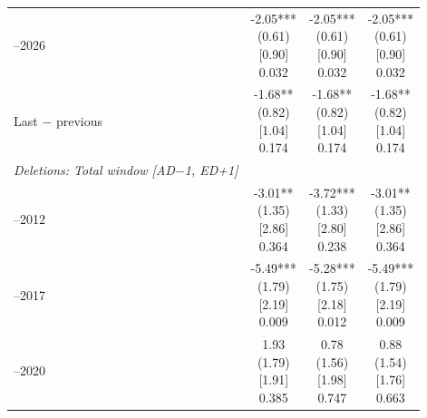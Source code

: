 \begin{threeparttable}
\begin{tabular}{@{}lccc}
\addlinespace[0.25ex]
\addlinespace[0.25ex]
2024–2026 & \makecell{-2.05***\\(0.61)\\{}[0.90]\\{0.032}} & \makecell{-2.05***\\(0.61)\\{}[0.90]\\{0.032}} & \makecell{-2.05***\\(0.61)\\{}[0.90]\\{0.032}} \\
\addlinespace[0.25ex]
\addlinespace[0.25ex]
Last $-$ previous & \makecell{-1.68**\\(0.82)\\{}[1.04]\\{0.174}} & \makecell{-1.68**\\(0.82)\\{}[1.04]\\{0.174}} & \makecell{-1.68**\\(0.82)\\{}[1.04]\\{0.174}} \\
\addlinespace[0.25ex]
\midrule
\emph{Deletions: Total window [AD$-$1, ED+1]} \\
\addlinespace[0.25ex]
\addlinespace[1ex]
2007–2012 & \makecell{-3.01**\\(1.35)\\{}[2.86]\\{0.364}} & \makecell{-3.72***\\(1.33)\\{}[2.80]\\{0.238}} & \makecell{-3.01**\\(1.35)\\{}[2.86]\\{0.364}} \\
\addlinespace[0.25ex]
\addlinespace[0.25ex]
2013–2017 & \makecell{-5.49***\\(1.79)\\{}[2.19]\\{0.009}} & \makecell{-5.28***\\(1.75)\\{}[2.18]\\{0.012}} & \makecell{-5.49***\\(1.79)\\{}[2.19]\\{0.009}} \\
\addlinespace[0.25ex]
\addlinespace[0.25ex]
2018–2020 & \makecell{1.93\\(1.79)\\{}[1.91]\\{0.385}} & \makecell{0.78\\(1.56)\\{}[1.98]\\{0.747}} & \makecell{0.88\\(1.54)\\{}[1.76]\\{0.663}} \\

\end{tabular}
\end{threeparttable}
